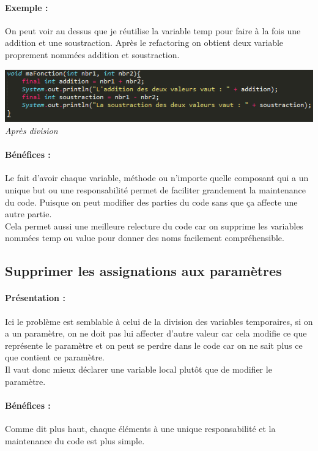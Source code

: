 \documentclass[a4paper,twoside,12pt,openright]{report}
\begin{document}
\paragraph{Exemple :}
On peut voir au dessus que je réutilise la variable temp pour faire à la fois une addition et une soustraction. Après le refactoring on obtient deux variable proprement nommées addition et soustraction.

\begin{center}
\includegraphics[scale=1]{Image/Diviser_Temp2.png}\\
\itshape{Après division}
\end{center}

\paragraph{Bénéfices :}
Le fait d'avoir chaque variable, méthode ou n'importe quelle composant qui a un unique but ou une responsabilité permet de faciliter grandement la maintenance du code. Puisque on peut modifier des parties du code sans que ça affecte une autre partie.\\
Cela permet aussi une meilleure relecture du code car on supprime les variables nommées temp ou value pour donner des noms facilement compréhensible.\\

\subsection{Supprimer les assignations aux paramètres}
\paragraph{Présentation :}
Ici le problème est semblable à celui de la division des variables temporaires, si on a un paramètre, on ne doit pas lui affecter d'autre valeur car cela modifie ce que représente le paramètre et on peut se perdre dans le code car on ne sait plus ce que contient ce paramètre.\\
Il vaut donc mieux déclarer une variable local plutôt que de modifier le paramètre.

\paragraph{Bénéfices :}
Comme dit plus haut, chaque éléments à une unique responsabilité et la maintenance du code est plus simple.\\
\end{document}
